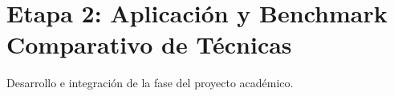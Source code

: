 \section{Etapa 2: Aplicación y Benchmark Comparativo de Técnicas}
Desarrollo e integración de la fase del proyecto académico.
